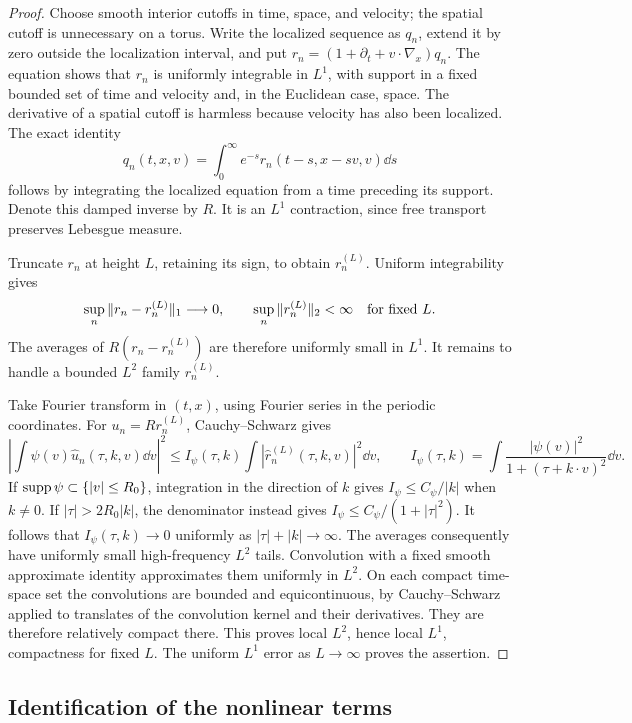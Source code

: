 \begin{proof}
Choose smooth interior cutoffs in time, space, and velocity; the spatial
cutoff is unnecessary on a torus. Write the localized sequence as
\(q_n\), extend it by zero outside the localization interval, and put
\(r_n=(1+\partial_t+v\cdot\nabla_x)q_n\). The equation shows that
\(r_n\) is uniformly integrable in \(L^1\), with support in a fixed
bounded set of time and velocity and, in the Euclidean case, space.
The derivative of a spatial cutoff is harmless because velocity has
also been localized. The exact identity
\[
q_n(t,x,v)=\int_0^\infty e^{-s}r_n(t-s,x-sv,v)\dd s
\]
follows by integrating the localized equation from a time preceding its
support. Denote this damped inverse by \(R\). It is an \(L^1\)
contraction, since free transport preserves Lebesgue measure.

Truncate \(r_n\) at height \(L\), retaining its sign, to obtain
\(r_n^{(L)}\). Uniform integrability gives
\[
\sup_n\|r_n-r_n^{(L)}\|_1\longrightarrow0,
\qquad
\sup_n\|r_n^{(L)}\|_2<\infty
\quad\hbox{for fixed }L.
\]
The averages of \(R(r_n-r_n^{(L)})\) are therefore uniformly small
in \(L^1\). It remains to handle a bounded \(L^2\) family \(r_n^{(L)}\).

Take Fourier transform in \((t,x)\), using Fourier series in the
periodic coordinates. For \(u_n=Rr_n^{(L)}\), Cauchy--Schwarz gives
\[
\left|\int\psi(v)\widehat u_n(\tau,k,v)\dd v\right|^2
\leq I_\psi(\tau,k)
       \int|\widehat r_n^{(L)}(\tau,k,v)|^2\dd v,
\qquad
I_\psi(\tau,k)=\int
 \frac{|\psi(v)|^2}{1+(\tau+k\cdot v)^2}\dd v.
\]
If \(\operatorname{supp}\psi\subset\{|v|\leq R_0\}\), integration in the
direction of \(k\) gives \(I_\psi\leq C_\psi/|k|\) when \(k\ne0\).
If \(|\tau|>2R_0|k|\), the denominator instead gives
\(I_\psi\leq C_\psi/(1+|\tau|^2)\). It follows that
\(I_\psi(\tau,k)\to0\) uniformly as \(|\tau|+|k|\to\infty\).
The averages consequently have uniformly small high-frequency
\(L^2\) tails. Convolution with a fixed smooth approximate identity
approximates them uniformly in \(L^2\). On each compact time-space
set the convolutions are bounded and equicontinuous, by Cauchy--Schwarz
applied to translates of the convolution kernel and their derivatives.
They are therefore relatively compact there. This proves local
\(L^2\), hence local \(L^1\), compactness for fixed \(L\).
The uniform \(L^1\) error as \(L\to\infty\) proves the assertion.
\end{proof}

\subsection{Identification of the nonlinear terms}

